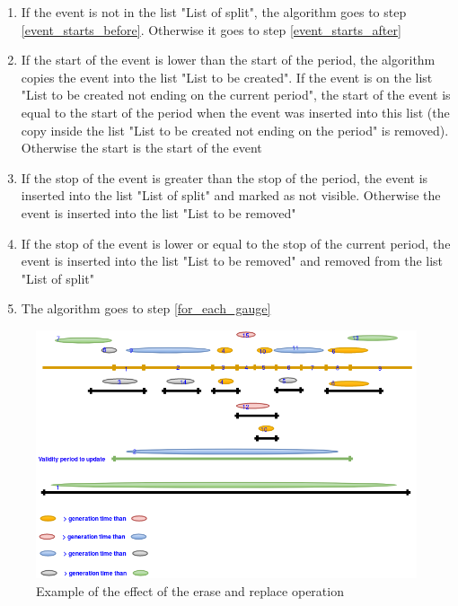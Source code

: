 \begin{enumerate}
\item If the event is not in the list "List of split", the algorithm goes to step \ref{event_starts_before}. Otherwise it goes to step \ref{event_starts_after}
\item \label{event_starts_before} If the start of the event is lower than the start of the period, the algorithm copies the event into the list "List to be created". If the event is on the list "List to be created not ending on the current period", the start of the event is equal to the start of the period when the event was inserted into this list (the copy inside the list "List to be created not ending on the period" is removed). Otherwise the start is the start of the event
\item If the stop of the event is greater than the stop of the period, the event is inserted into the list "List of split" and marked as not visible. Otherwise the event is inserted into the list "List to be removed"
\item \label{event_starts_after} If the stop of the event is lower or equal to the stop of the current period, the event is inserted into the list "List to be removed" and removed from the list "List of split"
\item The algorithm goes to step \ref{for_each_gauge}
\end{enumerate}

\begin{figure}[H]
  \begin{center}
	\centering\includegraphics[width=150mm]{../fig/erase_and_replace_algorithm.png}
	\caption{Example of the effect of the erase and replace operation}
	\label{fg:erase_and_replace_algorithm}
  \end{center}
\end{figure}

